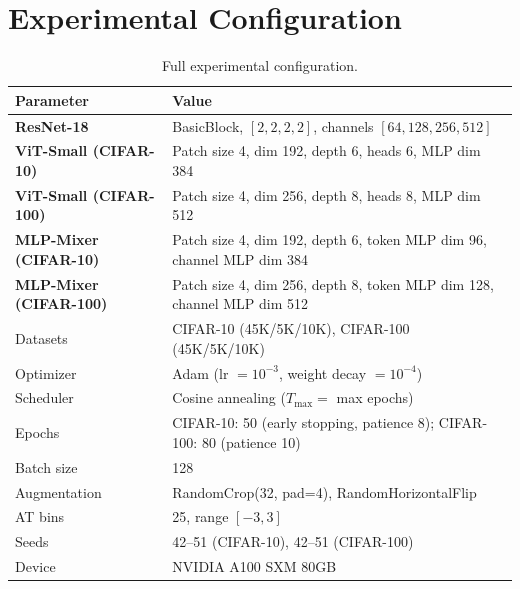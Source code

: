 \documentclass{article}
\begin{document}
\section{Experimental Configuration}
\label{app:config}

\begin{table}[t]
\caption{Full experimental configuration.}
\label{tab:config}
\centering
\small
\begin{tabular}{@{}lp{10cm}@{}}
\toprule
Parameter & Value \\
\midrule
\textbf{ResNet-18} & BasicBlock, $[2,2,2,2]$, channels $[64,128,256,512]$ \\
\textbf{ViT-Small (CIFAR-10)} & Patch size 4, dim 192, depth 6, heads 6, MLP dim 384 \\
\textbf{ViT-Small (CIFAR-100)} & Patch size 4, dim 256, depth 8, heads 8, MLP dim 512 \\
\textbf{MLP-Mixer (CIFAR-10)} & Patch size 4, dim 192, depth 6, token MLP dim 96, channel MLP dim 384 \\
\textbf{MLP-Mixer (CIFAR-100)} & Patch size 4, dim 256, depth 8, token MLP dim 128, channel MLP dim 512 \\
Datasets & CIFAR-10 (45K/5K/10K), CIFAR-100 (45K/5K/10K) \\
Optimizer & Adam (lr $= 10^{-3}$, weight decay $= 10^{-4}$) \\
Scheduler & Cosine annealing ($T_{\max} = $ max epochs) \\
Epochs & CIFAR-10: 50 (early stopping, patience 8); CIFAR-100: 80 (patience 10) \\
Batch size & 128 \\
Augmentation & RandomCrop(32, pad=4), RandomHorizontalFlip \\
AT bins & 25, range $[-3, 3]$ \\
Seeds & 42--51 (CIFAR-10), 42--51 (CIFAR-100) \\
Device & NVIDIA A100 SXM 80GB \\
\bottomrule
\end{tabular}
\end{table}
\end{document}

